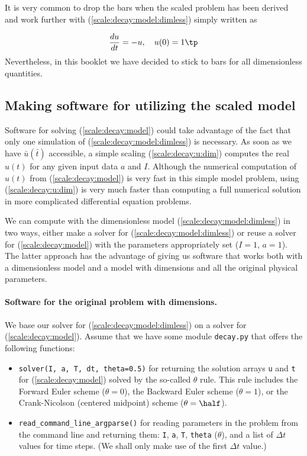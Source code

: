 \documentclass[graybox,envcountchap,sectrefs,final]{svmonodo}
\begin{document}
It is very common to drop the bars when the scaled problem has been
derived and work further with (\ref{scale:decay:model:dimless}) simply
written as

\[
\frac{du}{dt} = -u,\quad u(0)=1
\tp
\]
Nevertheless, in this booklet we have decided to stick to bars for all
dimensionless quantities.


\subsection{Making software for utilizing the scaled model}
\label{sec:scale:decay:prog}

Software for solving (\ref{scale:decay:model}) could take advantage
of the fact that only one simulation of (\ref{scale:decay:model:dimless})
is necessary. As soon as we have $\bar u(\bar t)$ accessible,
a simple scaling (\ref{scale:decay:u:dim}) computes the real $u(t)$
for any given input data $a$ and $I$. Although the numerical computation of
$u(t)$ from (\ref{scale:decay:model}) is very fast in this simple model
problem, using (\ref{scale:decay:u:dim}) is very much faster than
computing a full numerical solution in more complicated
differential equation problems.

We can compute with the dimensionless model (\ref{scale:decay:model:dimless})
in two ways, either make a solver for (\ref{scale:decay:model:dimless})
or reuse a solver for (\ref{scale:decay:model}) with the parameters
appropriately set ($I=1$, $a=1$).
The latter approach has the advantage of giving us
software that works both with a dimensionless model and a model
with dimensions and all the original physical parameters.

\paragraph{Software for the original problem with dimensions.}
We base our solver for
(\ref{scale:decay:model:dimless}) on a solver for (\ref{scale:decay:model}).
Assume that we have some module \texttt{decay.py} that offers the following
functions:

\begin{itemize}
  \item \texttt{solver(I, a, T, dt, theta=0.5)} for returning the solution arrays
    \texttt{u} and \texttt{t} for (\ref{scale:decay:model}) solved by the so-called
    $\theta$ rule. This rule includes the Forward Euler scheme ($\theta=0$),
    the Backward Euler scheme ($\theta=1$), or the Crank-Nicolson
    (centered midpoint) scheme ($\theta=\half$).

  \item \Verb!read_command_line_argparse()! for reading parameters in the problem
    from the command line and returning them: \texttt{I}, \texttt{a}, \texttt{T}, \texttt{theta} ($\theta$),
    and a list of $\Delta t$ values for time steps. (We shall only make
    use of the first $\Delta t$ value.)
\end{itemize}
\end{document}
